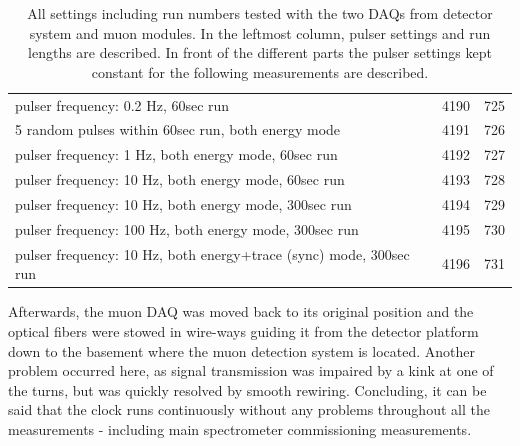 \begin{table}
\begin{tabularx}{0.9 \textwidth}{|X|cc|}
		\hline
		pulser frequency: 0.2 Hz, 60sec run & 4190 & 725 \\
		5 random pulses within 60sec run, both energy mode & 4191 & 726 \\
		pulser frequency: 1 Hz, both energy mode, 60sec run & 4192 & 727 \\
		pulser frequency: 10 Hz, both energy mode, 60sec run & 4193 & 728 \\
		pulser frequency: 10 Hz, both energy mode, 300sec run & 4194 & 729 \\
		pulser frequency: 100 Hz, both energy mode, 300sec run & 4195 & 730 \\
		pulser frequency: 10 Hz, both energy+trace (sync) mode, 300sec run & 4196 & 731 \\
  		\hline
  	\end{tabularx}
	\caption[Synchronization test Settings]{All settings including run numbers tested with the two DAQs from detector system and muon modules. In the leftmost column, pulser settings and run lengths are described. In front of the different parts the pulser settings kept constant for the following measurements are described.}
	\label{tab:syncTests}
  \end{table}

  Afterwards, the muon DAQ was moved back to its original position and the optical fibers were stowed in wire-ways guiding it from the detector platform down to the basement where the muon detection system is located. Another problem occurred here, as signal transmission was impaired by a kink at one of the turns, but was quickly resolved by smooth rewiring.
  Concluding, it can be said that the clock runs continuously without any problems throughout all the measurements - including main spectrometer commissioning measurements.

  
